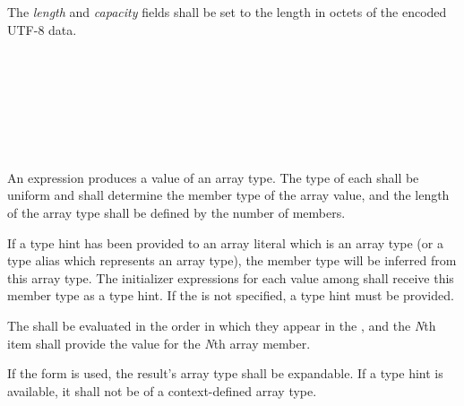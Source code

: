 \specsubsubitem
The \textit{length} and \textit{capacity} fields shall be set to the length in
octets of the encoded \hbox{UTF-8} data.


\begin{grammar}
 \\
	\terminal{[}  \terminal{]} \\

 \\
	 \optional{\terminal{,}} \\
	  \\
	 \terminal{,}  \\
\end{grammar}

\specsubsubitem
An  expression produces a value of an array type.
The type of each  shall be uniform and shall
determine the member type of the array value, and the length of the array type
shall be defined by the number of members.

\specsubsubitem
If a type hint has been provided to an array literal which is an array type (or
a type alias which represents an array type), the member type will be inferred
from this array type. The initializer expressions for each value among
 shall receive this member type as a type hint. If
the  is not specified, a type hint must be provided.

\specsubsubitem
The  shall be evaluated in the order in which they
appear in the , and the \textit{N}th item shall
provide the value for the \textit{N}th array member.

\specsubsubitem
If the  form is used, the result's array type shall be expandable.
If a type hint is available, it shall not be of a context-defined array type.


